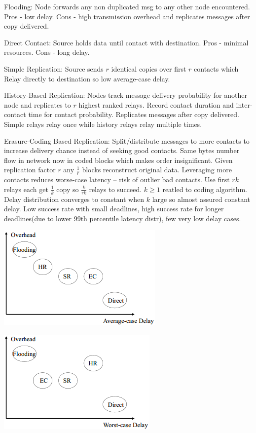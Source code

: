 \documentclass[8pt]{extarticle}
\begin{document}
\begin{multicols}{2}
Flooding: Node forwards any non duplicated msg to any other node encountered. Pros - low delay. Cons - high transmission overhead and replicates messages after copy delivered.

Direct Contact: Source holds data until contact with destination. Pros - minimal resources. Cons - long delay.

Simple Replication: Source sends $r$ identical copies over first $r$ contacts which Relay directly to destination so low average-case delay.

History-Based Replication: Nodes track message delivery probability for another node and replicates to $r$ highest ranked relays. Record contact duration and inter-contact time for contact probability. Replicates messages after copy delivered. Simple relays relay once while history relays relay multiple times.

Erasure-Coding Based Replication: Split/distribute messages to more contacts to increase delivery chance instead of seeking good contacts. Same bytes number flow in network now in coded blocks which makes order insignificant. Given replication factor $r$ any $\frac{1}{r}$ blocks reconstruct original data. Leveraging more contacts reduces worse-case latency – risk of outlier bad contacts. Use first $rk$ relays each get $\frac{1}{k}$ copy so $\frac{k}{rk}$ relays to succeed. $k\geq{1}$ reatled to coding algorithm. Delay distribution converges to constant when $k$ large so almost assured constant delay. Low success rate with small deadlines, high success rate for longer deadlines(due to lower 99th percentile latency distr), few very low delay cases.

\includegraphics{dtnsummary1.png}

\includegraphics{dtnsummary2.png}


\end{multicols}
\end{document}
